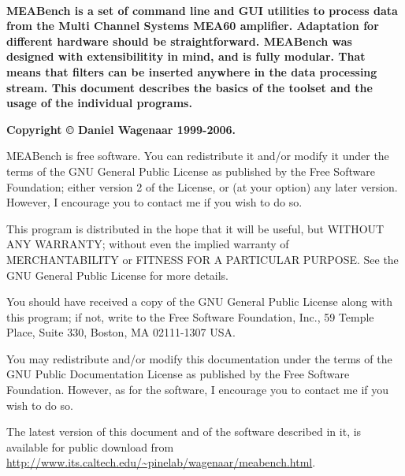 \documentclass[12pt,oneside]{book}
\def\Meabench{{MEABench}\xspace}
\begin{document}
\thispagestyle{empty}
\setcounter{page}{1}

~\vspace{.5in}

\begin{center}

\vspace{10pt}


\vspace{10pt}


\vspace{1in}

\noindent\begin{minipage}{.7\textwidth}
\noindent\bf
\Meabench is a set of command line and GUI utilities to process data
from the Multi Channel Systems MEA60 amplifier.  Adaptation for
different hardware should be straightforward.  \Meabench was designed with
extensibilitity in mind, and is fully modular. That means that filters
can be inserted anywhere in the data processing stream. This document
describes the basics of the toolset and the usage of the individual
programs.
\end{minipage}

\end{center}

\vfill%
{\scriptsize\bf Copyright \copyright{} Daniel Wagenaar 1999-2006.

{\Meabench} is free software. You can redistribute it 
and/or modify it under the terms of the GNU General Public License as
published by the Free Software Foundation; either version 2 of the
License, or (at your option) any later version. However, I encourage
you to contact me if you wish to do so.

    This program is distributed in the hope that it will be useful,
    but WITHOUT ANY WARRANTY; without even the implied warranty of
    MERCHANTABILITY or FITNESS FOR A PARTICULAR PURPOSE. See the GNU
    General Public License for more details.

    You should have received a copy of the GNU General Public License
    along with this program; if not, write to the Free Software
    Foundation, Inc., 59 Temple Place, Suite 330, Boston, MA
    02111-1307 USA.

You may redistribute and/or modify this documentation under the terms
of the GNU Public Documentation License as published by the Free
Software Foundation. However, as for the software, I encourage you to
contact me if you wish to do so.

The latest version of this document and of the software described in
it, is available for public download from
 \url{http://www.its.caltech.edu/~pinelab/wagenaar/meabench.html}.
}
\end{document}
